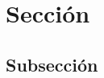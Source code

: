 \documentclass[../TFG.tex]{subfiles}
\begin{document}
\section{Sección}

\lipsum[0-5]

\subsection{Subsección}

\lipsum[0-5]
\end{document}
